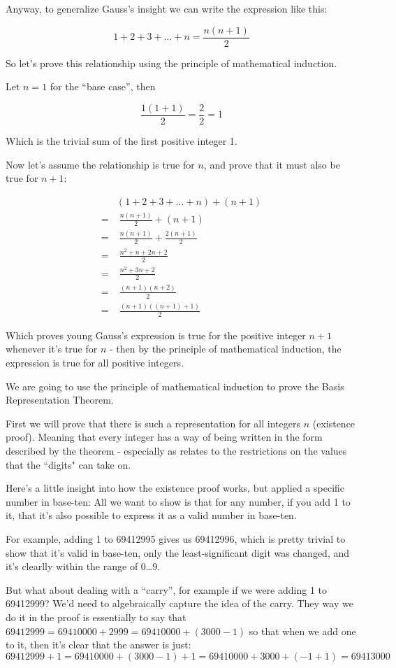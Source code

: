 \documentclass{article}
\begin{document}
Anyway,
to generalize Gauss's insight we can write the expression like this:

\[1+2+3+\ldots+n=\frac{n(n+1)}{2}\]

So let's prove this relationship using the principle of mathematical induction.
\bigskip

Let $n=1$ for the ``base case'',
then

\[\frac{1(1+1)}{2}=\frac{2}{2}=1\]

Which is the trivial sum of the first positive integer 1.
\bigskip

Now let's assume the relationship is true for $n$,
and prove that it must also be true for $n+1$:

\begin{align*}
&(1+2+3+\ldots+n) + (n+1)\\
= & \; \frac{n(n+1)}{2} + (n+1)\\
= & \; \frac{n(n+1)}{2} + \frac{2(n+1)}{2}\\
= & \; \frac{n^2+n+2n+2}{2}\\
= & \; \frac{n^2+3n+2}{2}\\
= & \; \frac{(n+1)(n+2)}{2}\\
= & \; \frac{(n+1)((n+1)+1)}{2}
\end{align*}

Which proves young Gauss's expression is true for
the positive integer $n+1$ whenever it's true for $n$ - then
by the principle of mathematical induction,
the expression is true for all positive integers.
\bigskip

We are going to use the principle of mathematical induction to prove the Basis Representation Theorem.

First we will prove that there is such a representation for all
integers $n$ (existence proof).
Meaning that every integer has a way of being written
in the form described by the theorem - especially as
relates to the restrictions on the values that the ``digits" can take on.

Here's a little insight into how the existence proof works, but applied a specific number in base-ten:
All we want to show is that for any number, if you add 1 to it, that it's also possible to express it as a valid number in base-ten.

For example, adding 1 to 69412995 gives us 69412996, which is pretty trivial to show that it's valid in base-ten, only the least-significant digit was
changed, and it's clearlly within the range of 0\dots{}9.

But what about dealing with a ``carry'', for example 
if we were adding 1 to 69412999? We'd need to algebraically capture the idea of the carry.  They way
we do it in the proof is essentially to say that $69412999 = 69410000 + 2999 = 69410000 + (3000-1)$ so that when we add one to it, then
it's clear that the answer is just:\\
\[69412999 + 1 = 69410000 + (3000-1) + 1 = 69410000 + 3000 + (-1 + 1) = 69413000\]
\end{document}
